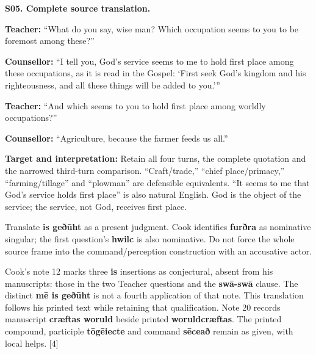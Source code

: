 \par\begin{minipage}{\linewidth}\raggedright
\textbf{S05. Complete source translation.}

\textbf{Teacher:} “What do you say, wise man? Which occupation seems to you to be foremost among these?”

\textbf{Counsellor:} “I tell you, God's service seems to me to hold first place among these occupations, as it is read in the Gospel: ‘First seek God's kingdom and his righteousness, and all these things will be added to you.’”

\textbf{Teacher:} “And which seems to you to hold first place among worldly occupations?”

\textbf{Counsellor:} “Agriculture, because the farmer feeds us all.”

\textbf{Target and interpretation:} Retain all four turns, the complete quotation and the narrowed third-turn comparison. “Craft/\allowbreak{}trade,” “chief place/\allowbreak{}primacy,” “farming/\allowbreak{}tillage” and “plowman” are defensible equivalents. “It seems to me that God's service holds first place” is also natural English. God is the object of the service; the service, not God, receives first place.

Translate \textbf{is geðūht} as a present judgment. Cook identifies \textbf{furðra} as nominative singular; the first question's \textbf{hwilc} is also nominative. Do not force the whole source frame into the command/\allowbreak{}perception construction with an accusative actor.

Cook's note 12 marks three \textbf{is} insertions as conjectural, absent from his manuscripts: those in the two Teacher questions and the \textbf{swā-swā} clause. The distinct \textbf{mē is geðūht} is not a fourth application of that note. This translation follows his printed text while retaining that qualification. Note 20 records manuscript \textbf{cræftas woruld} beside printed \textbf{woruldcræftas}. The printed compound, participle \textbf{tōgēiecte} and command \textbf{sēceað} remain as given, with local helps. [4]

\end{minipage}\par\addvspace{4pt}

